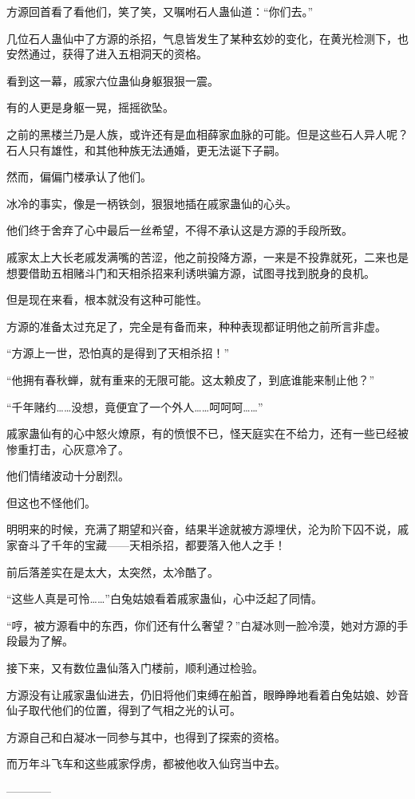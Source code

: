 \begin{this_body}
方源回首看了看他们，笑了笑，又嘱咐石人蛊仙道：“你们去。”

几位石人蛊仙中了方源的杀招，气息皆发生了某种玄妙的变化，在黄光检测下，也安然通过，获得了进入五相洞天的资格。

看到这一幕，戚家六位蛊仙身躯狠狠一震。

有的人更是身躯一晃，摇摇欲坠。

之前的黑楼兰乃是人族，或许还有是血相薛家血脉的可能。但是这些石人异人呢？石人只有雄性，和其他种族无法通婚，更无法诞下子嗣。

然而，偏偏门楼承认了他们。

冰冷的事实，像是一柄铁剑，狠狠地插在戚家蛊仙的心头。

他们终于舍弃了心中最后一丝希望，不得不承认这是方源的手段所致。

戚家太上大长老戚发满嘴的苦涩，他之前投降方源，一来是不投靠就死，二来也是想要借助五相赌斗门和天相杀招来利诱哄骗方源，试图寻找到脱身的良机。

但是现在来看，根本就没有这种可能性。

方源的准备太过充足了，完全是有备而来，种种表现都证明他之前所言非虚。

“方源上一世，恐怕真的是得到了天相杀招！”

“他拥有春秋蝉，就有重来的无限可能。这太赖皮了，到底谁能来制止他？”

“千年赌约……没想，竟便宜了一个外人……呵呵呵……”

戚家蛊仙有的心中怒火燎原，有的愤恨不已，怪天庭实在不给力，还有一些已经被惨重打击，心灰意冷了。

他们情绪波动十分剧烈。

但这也不怪他们。

明明来的时候，充满了期望和兴奋，结果半途就被方源埋伏，沦为阶下囚不说，戚家奋斗了千年的宝藏——天相杀招，都要落入他人之手！

前后落差实在是太大，太突然，太冷酷了。

“这些人真是可怜……”白兔姑娘看着戚家蛊仙，心中泛起了同情。

“哼，被方源看中的东西，你们还有什么奢望？”白凝冰则一脸冷漠，她对方源的手段最为了解。

接下来，又有数位蛊仙落入门楼前，顺利通过检验。

方源没有让戚家蛊仙进去，仍旧将他们束缚在船首，眼睁睁地看着白兔姑娘、妙音仙子取代他们的位置，得到了气相之光的认可。

方源自己和白凝冰一同参与其中，也得到了探索的资格。

而万年斗飞车和这些戚家俘虏，都被他收入仙窍当中去。

------------

\end{this_body}

